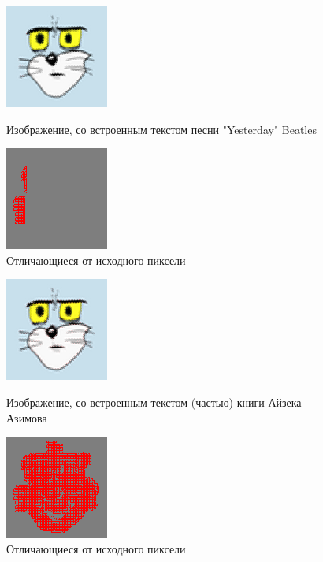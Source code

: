 \documentclass[a4paper]{article}
\begin{document}
  \begin{figure}[H]
    \centering
    \begin{minipage}[t]{0.4\textwidth}
        \centering
        \includegraphics{stego_2}
        \caption{Изображение, со встроенным текстом песни "Yesterday" Beatles}
    \end{minipage}
    \hfill
    \begin{minipage}[t]{0.4\textwidth}
        \centering
        \includegraphics{diff_2}
        \caption{Отличающиеся от исходного пиксели} 
    \end{minipage}
  \end{figure}
  
  \begin{figure}[H]
    \centering
    \begin{minipage}[t]{0.4\textwidth}
        \centering
        \includegraphics{stego_3}
        \caption{Изображение, со встроенным текстом (частью) книги Айзека Азимова}
    \end{minipage}
    \hfill
    \begin{minipage}[t]{0.4\textwidth}
        \centering
        \includegraphics{diff_3}
        \caption{Отличающиеся от исходного пиксели} 
    \end{minipage}
  \end{figure}
\end{document}
